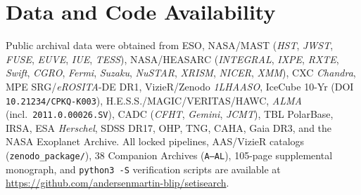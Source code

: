 \documentclass[twocolumn,10pt]{article}
\begin{document}
\section*{Data and Code Availability}
\noindent Public archival data were obtained from ESO, NASA/MAST (\textit{HST}, \textit{JWST}, \textit{FUSE}, \textit{EUVE}, \textit{IUE}, \textit{TESS}), NASA/HEASARC (\textit{INTEGRAL}, \textit{IXPE}, \textit{RXTE}, \textit{Swift}, \textit{CGRO}, \textit{Fermi}, \textit{Suzaku}, \textit{NuSTAR}, \textit{XRISM}, \textit{NICER}, \textit{XMM}), CXC \textit{Chandra}, MPE SRG/\textit{eROSITA}-DE DR1, VizieR/Zenodo \textit{1LHAASO}, IceCube 10-Yr (DOI \texttt{10.21234/CPKQ-K003}), H.E.S.S./MAGIC/VERITAS/HAWC, \textit{ALMA} (incl.\ \texttt{2011.0.00026.SV}), CADC (\textit{CFHT}, \textit{Gemini}, \textit{JCMT}), TBL PolarBase, IRSA, ESA \textit{Herschel}, SDSS DR17, OHP, TNG, CAHA, Gaia DR3, and the NASA Exoplanet Archive. All locked pipelines, AAS/VizieR catalogs (\texttt{zenodo\_package/}), 38 Companion Archives (\texttt{A--AL}), 105-page supplemental monograph, and \texttt{python3 -S} verification scripts are available at \url{https://github.com/andersenmartin-blip/setisearch}.

\clearpage
\onecolumn
\appendix
\end{document}
